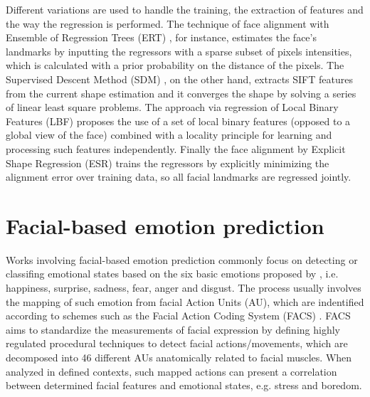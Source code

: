 Different variations are used to handle the training, the extraction of features and the way the regression is performed. The technique of face alignment with Ensemble of Regression Trees (ERT) \parencite{kazemi2014one}, for instance, estimates the face's landmarks by inputting the regressors with a sparse subset of pixels intensities, which is calculated with a prior probability on the distance of the pixels. The Supervised Descent Method (SDM) \parencite{xiong2013supervised}, on the other hand, extracts SIFT features from the current shape estimation and it converges the shape by solving a series of linear least square problems. The approach via regression of Local Binary Features (LBF) \parencite{ren2014face} proposes the use of a set of local binary features (opposed to a global view of the face) combined with a locality principle for learning and processing such features independently. Finally the face alignment by Explicit Shape Regression (ESR) \parencite{cao2014face} trains the regressors by explicitly minimizing the alignment error over training data, so all facial landmarks are regressed jointly.

\section{Facial-based emotion prediction}

Works involving facial-based emotion prediction commonly focus on detecting or classifing emotional states based on the six basic emotions proposed by \textcite{ekman1971constants}, i.e. happiness, surprise, sadness, fear, anger and disgust. The process usually involves the mapping of such emotion from facial Action Units (AU), which are indentified according to schemes such as the Facial Action Coding System (FACS) \parencite{ekman1977facial,cohn2007observer}. FACS aims to standardize the measurements of facial expression by defining highly regulated procedural techniques to detect facial actions/movements, which are decomposed into 46 different AUs anatomically related to facial muscles. When analyzed in defined contexts, such mapped actions can present a correlation between determined facial features and emotional states, e.g. stress and boredom.

